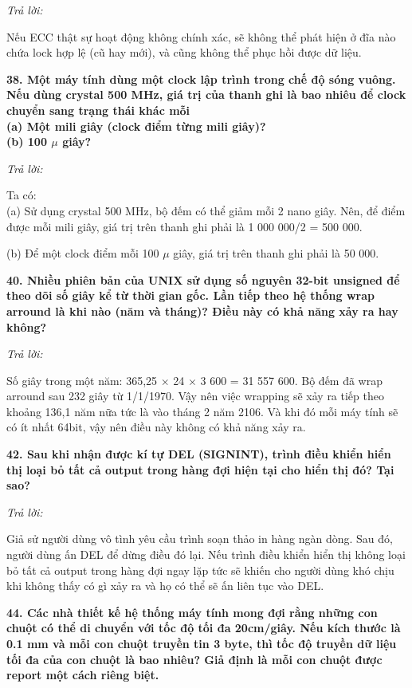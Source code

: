 \documentclass{report}
\begin{document}
\bigskip
\textit{Trả lời:}

\smallskip
Nếu ECC thật sự hoạt động không chính xác, sẽ không thể phát hiện ở đĩa nào chứa lock hợp lệ (cũ hay mới), và cũng không thể phục hồi được dữ liệu.


\bigskip
\textbf{38. Một máy tính dùng một clock lập trình trong chế độ sóng vuông. Nếu dùng crystal 500 MHz, giá trị của thanh ghi là bao nhiêu để clock chuyển sang trạng thái khác mỗi\\
(a) Một mili giây (clock điểm từng mili giây)?\\
(b) 100 $\mu$ giây?}

\bigskip
\textit{Trả lời:}

\smallskip
Ta có:\\
(a) Sử dụng crystal 500 MHz, bộ đếm có thể giảm mỗi 2 nano giây. Nên, để điểm được mỗi mili giây, giá trị trên thanh ghi phải là 1 000 000/2 = 500 000.

\smallskip
(b) Để một clock điểm mỗi 100 $\mu$ giây, giá trị trên thanh ghi phải là 50 000.

\bigskip
\textbf{40. Nhiều phiên bản của UNIX sử dụng số nguyên 32-bit unsigned để theo dõi số giây kể từ thời gian gốc. Lần tiếp theo hệ thống wrap arround là khi nào (năm và tháng)? Điều này có khả năng xảy ra hay không?}

\bigskip
\textit{Trả lời:}

\smallskip
Số giây trong một năm: 365,25 $\times$ 24 $\times$ 3 600 = 31 557 600. Bộ đếm đã wrap arround sau 232 giây từ 1/1/1970. Vậy nên việc wrapping sẽ xảy ra tiếp theo khoảng 136,1 năm nữa tức là vào tháng 2 năm 2106. Và khi đó mỗi máy tính sẽ có ít nhất 64bit, vậy nên điều này không có khả năng xảy ra.

\bigskip
\textbf{42. Sau khi nhận được kí tự DEL (SIGNINT), trình điều khiển hiển thị loại bỏ tất cả output trong hàng đợi hiện tại cho hiển thị đó? Tại sao?}

\bigskip
\textit{Trả lời:}

\smallskip
Giả sử người dùng vô tình yêu cầu trình soạn thảo in hàng ngàn dòng. Sau đó, người dùng ấn DEL để dừng điều đó lại. Nếu trình điều khiển hiển thị không loại bỏ tất cả output trong hàng đợi ngay lặp tức sẽ khiến cho người dùng khó chịu khi không thấy có gì xảy ra và họ có thể sẽ ấn liên tục vào DEL.

\bigskip
\textbf{44. Các nhà thiết kế hệ thống máy tính mong đợi rằng những con chuột có thể di chuyển với tốc độ tối đa 20cm/giây. Nếu kích thước là 0.1 mm và mỗi con chuột truyền tin 3 byte, thì tốc độ truyền dữ liệu tối đa của con chuột là bao nhiêu? Giả định là mỗi con chuột được report một cách riêng biệt.}
\end{document}
